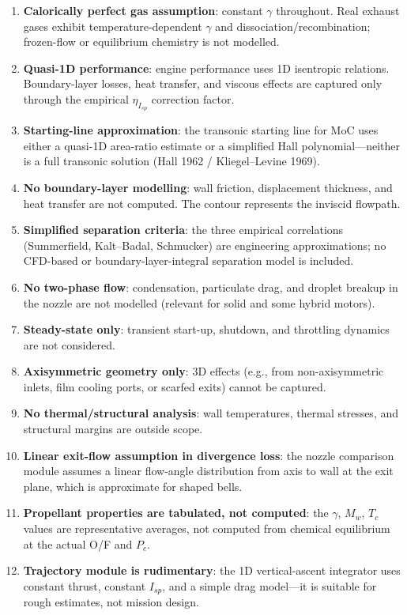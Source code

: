 \documentclass[11pt,a4paper]{article}
\begin{document}
\begin{enumerate}
\item \textbf{Calorically perfect gas assumption}: constant $\gamma$ throughout. Real exhaust gases exhibit temperature-dependent $\gamma$ and dissociation/recombination; frozen-flow or equilibrium chemistry is not modelled.

\item \textbf{Quasi-1D performance}: engine performance uses 1D isentropic relations. Boundary-layer losses, heat transfer, and viscous effects are captured only through the empirical $\eta_{I_{sp}}$ correction factor.

\item \textbf{Starting-line approximation}: the transonic starting line for MoC uses either a quasi-1D area-ratio estimate or a simplified Hall polynomial---neither is a full transonic solution (Hall 1962 / Kliegel--Levine 1969).

\item \textbf{No boundary-layer modelling}: wall friction, displacement thickness, and heat transfer are not computed. The contour represents the inviscid flowpath.

\item \textbf{Simplified separation criteria}: the three empirical correlations (Summerfield, Kalt--Badal, Schmucker) are engineering approximations; no CFD-based or boundary-layer-integral separation model is included.

\item \textbf{No two-phase flow}: condensation, particulate drag, and droplet breakup in the nozzle are not modelled (relevant for solid and some hybrid motors).

\item \textbf{Steady-state only}: transient start-up, shutdown, and throttling dynamics are not considered.

\item \textbf{Axisymmetric geometry only}: 3D effects (e.g., from non-axisymmetric inlets, film cooling ports, or scarfed exits) cannot be captured.

\item \textbf{No thermal/structural analysis}: wall temperatures, thermal stresses, and structural margins are outside scope.

\item \textbf{Linear exit-flow assumption in divergence loss}: the nozzle comparison module assumes a linear flow-angle distribution from axis to wall at the exit plane, which is approximate for shaped bells.

\item \textbf{Propellant properties are tabulated, not computed}: the $\gamma$, $M_w$, $T_c$ values are representative averages, not computed from chemical equilibrium at the actual O/F and $P_c$.

\item \textbf{Trajectory module is rudimentary}: the 1D vertical-ascent integrator uses constant thrust, constant $I_{sp}$, and a simple drag model---it is suitable for rough estimates, not mission design.
\end{enumerate}
\end{document}
